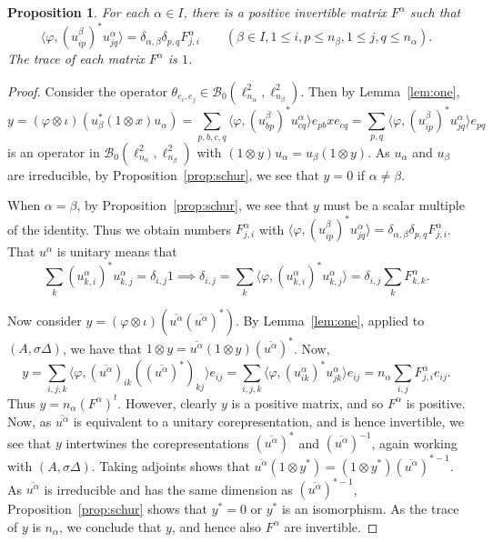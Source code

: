 \documentclass[twoside,a4paper,12pt]{article}
\theoremstyle{plain}
\newtheorem{proposition}{Proposition}[section]
\theoremstyle{definition}
\newcommand{\ip}[2]{\langle #1,#2 \rangle}
\newcommand{\mc}{\mathcal}
\begin{document}
\begin{proposition}\label{prop:fmatrices}
For each $\alpha\in I$, there is a positive invertible matrix $F^\alpha$
such that
\[ \ip{\varphi}{(u^\beta_{ip})^* u^\alpha_{jq}}
= \delta_{\alpha,\beta} \delta_{p,q} F^\alpha_{j,i}
\qquad (\beta\in I, 1\leq i,p\leq n_\beta, 1\leq j,q\leq n_\alpha). \]
The trace of each matrix $F^\alpha$ is $1$.
\end{proposition}
\begin{proof}
Consider the operator $\theta_{e_i,e_j}\in\mc B_0(\ell^2_{n_\alpha},
\ell^2_{n_\beta})$.  Then by Lemma~\ref{lem:one},
\[ y = (\varphi\otimes\iota)(u_\beta^*(1\otimes x)u_\alpha)
= \sum_{p,b,c,q} \ip{\varphi}{(u^\beta_{bp})^* u^\alpha_{cq}} e_{pb}xe_{cq}
= \sum_{p,q} \ip{\varphi}{(u^\beta_{ip})^* u^\alpha_{jq}} e_{pq} \]
is an operator in $\mc B_0(\ell^2_{n_\alpha},\ell^2_{n_\beta})$ with
$(1\otimes y)u_\alpha = u_\beta(1\otimes y)$.  As $u_\alpha$ and $u_\beta$ are
irreducible, by Proposition~\ref{prop:schur},
we see that $y=0$ if $\alpha\not=\beta$.

When $\alpha=\beta$, by Proposition~\ref{prop:schur}, we see that $y$ must be
a scalar multiple of the identity.  Thus we obtain numbers $F^\alpha_{j,i}$
with $\ip{\varphi}{(u^\beta_{ip})^* u^\alpha_{jq}}
= \delta_{\alpha,\beta} \delta_{p,q} F^\alpha_{j,i}$.  That $u^\alpha$ is
unitary means that
\[ \sum_k (u^\alpha_{k,i})^* u^\alpha_{k,j} = \delta_{i,j}1
\implies \delta_{i,j} = \sum_k \ip{\varphi}{(u^\alpha_{k,i})^* u^\alpha_{k,j}}
= \delta_{i,j} \sum_k F^\alpha_{k,k}. \]

Now consider $y = (\varphi\otimes\iota)(\overline{u^\alpha} 
(\overline{u^\alpha})^* )$.  By Lemma~\ref{lem:one}, applied to
$(A,\sigma\Delta)$, we have that $1\otimes y = \overline{u^\alpha}(1\otimes y)
(\overline{u^\alpha})^*$.  Now,
\[ y = \sum_{i,j,k} \ip{\varphi}{ (\overline{u^\alpha})_{ik}
((\overline{u^\alpha})^*)_{kj}} e_{ij}
= \sum_{i,j,k} \ip{\varphi}{(u^\alpha_{ik})^* u^\alpha_{jk}} e_{ij}
= n_\alpha \sum_{i,j} F^\alpha_{j,i} e_{ij}. \]
Thus $y = n_\alpha (F^\alpha)^t$.  However, clearly $y$ is a positive matrix,
and so $F^\alpha$ is positive.  Now, as $\overline{u^\alpha}$ is equivalent
to a unitary corepresentation, and is hence invertible, we see that $y$
intertwines the corepresentations $(\overline{u^\alpha})^*$ and
$(\overline{u^\alpha})^{-1}$, again working with $(A,\sigma\Delta)$.
Taking adjoints shows that $\overline{u^\alpha}(1\otimes y^*) =
(1\otimes y^*)(\overline{u^\alpha})^{*-1}$.  As $\overline{u^\alpha}$ is
irreducible and has the same dimension as $(\overline{u^\alpha})^{*-1}$,
Proposition~\ref{prop:schur} shows that $y^*=0$ or $y^*$ is an isomorphism.
As the trace of $y$ is $n_\alpha$, we conclude that $y$, and hence also
$F^\alpha$ are invertible.
\end{proof}
\end{document}
